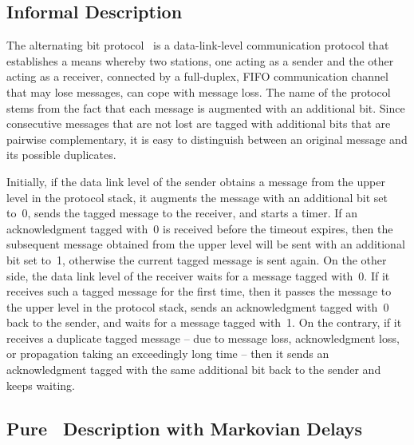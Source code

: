\subsection{Informal Description}

The alternating bit protocol~\cite{BSW} is a data-link-level communication protocol that establishes a means
whereby two stations, one acting as a sender and the other acting as a receiver, connected by a full-duplex, FIFO communication channel that may lose messages, can cope with message loss. The name of the protocol
stems from the fact that each message is augmented with an additional bit. Since consecutive messages that
are not lost are tagged with additional bits that are pairwise complementary, it is easy to distinguish
between an original message and its possible duplicates.

Initially, if the data link level of the sender obtains a message from the upper level in the protocol
stack, it augments the message with an additional bit set to~0, sends the tagged message to the receiver,
and starts a timer. If an acknowledgment tagged with~0 is received before the timeout expires, then the
subsequent message obtained from the upper level will be sent with an additional bit set to~1, otherwise the
current tagged message is sent again. On the other side, the data link level of the receiver waits for a
message tagged with~0. If it receives such a tagged message for the first time, then it passes the message
to the upper level in the protocol stack, sends an acknowledgment tagged with~0 back to the sender, and
waits for a message tagged with~1. On the contrary, if it receives a duplicate tagged message -- due to
message loss, acknowledgment loss, or propagation taking an exceedingly long time -- then it sends an
acknowledgment tagged with the same additional bit back to the sender and keeps waiting.


\subsection{Pure \aemilia\ Description with Markovian Delays}\label{abp}

